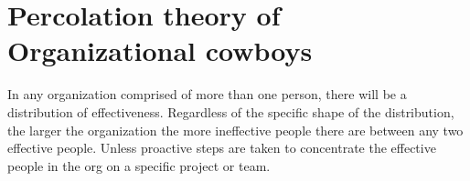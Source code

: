 \section{Percolation theory of Organizational cowboys}

In any organization comprised of more than one person, there will be a distribution of effectiveness. Regardless of the specific shape of the distribution, the larger the organization the more ineffective people there are between any two effective people. Unless proactive steps are taken to concentrate the effective people in the org on a specific project or team. 